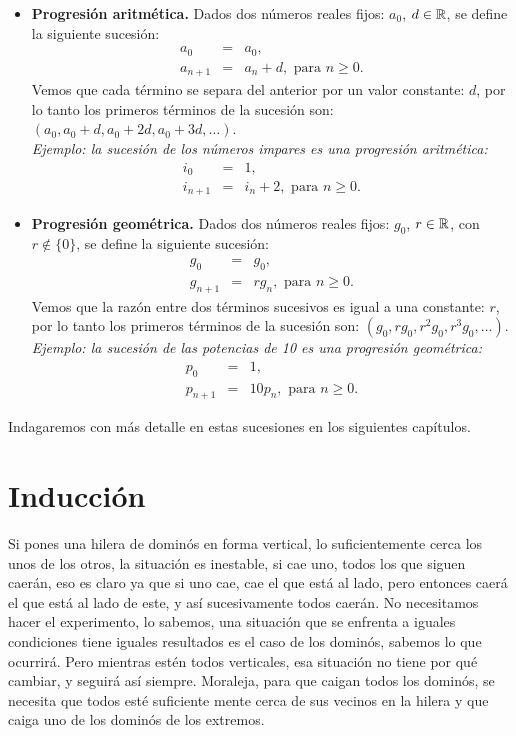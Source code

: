\begin{itemize}
\item {\bf Progresión aritmética.} Dados dos números reales fijos: $a_0$, $d\in\mathbb{R}$, se define la siguiente sucesión:
\begin{eqnarray*}
a_0&=&a_0,\\
a_{n+1}&=&a_n+d,\textrm{ para }n\ge0.
\end{eqnarray*}
Vemos que cada término se separa del anterior por un valor constante: $d$, por lo tanto los primeros términos de la sucesión  son: $(a_0,a_0+d, a_0+2d,a_0+3d,\dots)$.\\
{\em Ejemplo: la sucesión de los números impares es una progresión aritmética:
\begin{eqnarray*}
i_0&=&1,\\
i_{n+1}&=&i_n+2,\textrm{ para }n\ge0.
\end{eqnarray*}
}
\item {\bf Progresión geométrica.} Dados dos números reales fijos: $g_0$, $r\in\mathbb{R}$, con $r\not\in\{0\}$, se define la siguiente sucesión:
\begin{eqnarray*}
g_0&=&g_0,\\
g_{n+1}&=&rg_n,\textrm{ para }n\ge0.
\end{eqnarray*}
Vemos que la razón entre dos términos sucesivos es igual a una constante: $r$, por lo tanto los primeros términos de la sucesión  son: $(g_0,rg_0, r^2g_0,r^3g_0,\dots)$.
{\em Ejemplo: la sucesión de las potencias de 10 es una progresión geométrica:
\begin{eqnarray*}
p_0&=&1,\\
p_{n+1}&=&10p_n,\textrm{ para }n\ge0.
\end{eqnarray*}
}
\end{itemize}

Indagaremos con más detalle en estas sucesiones en los siguientes capítulos.



\section{Inducción}


Si pones una hilera de dominós en forma vertical, lo suficientemente cerca los unos de los otros, la situación es inestable, si cae uno, todos los que siguen caerán, eso es claro ya que si uno cae, cae el que está al lado, pero entonces caerá el que está al lado de este, y así sucesivamente todos caerán. No necesitamos hacer el experimento, lo sabemos, una situación  que se enfrenta a iguales condiciones tiene iguales resultados es el caso de los dominós, sabemos lo que ocurrirá.
Pero mientras estén todos verticales, esa situación no tiene por qué cambiar, y seguirá así siempre.
Moraleja, para que caigan todos los dominós, se necesita que todos esté suficiente mente cerca de sus vecinos en la hilera y que caiga uno de los dominós de los extremos.

